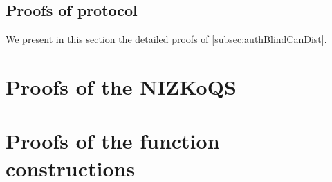 {    \subsection{Proofs of protocol \authBlindCanDist{}}\label{appendix:authBlindCanDist}
    We present in this section the detailed proofs of \cref{subsec:authBlindCanDist}.

    \textEnd[category=proofsAuthBlindCanDist]{}
    \printProofs[proofsAuthBlindCanDist]

    \section{Proofs of the NIZKoQS}
    \textEnd[category=proofsNIZKoQS]{}
    \printProofs[proofsNIZKoQS]

    \section{Proofs of the function constructions}\label{appendix:fctConstruction}
    \textEnd[category=functionConstructions]{}
    \printProofs[functionConstructions]
  }


